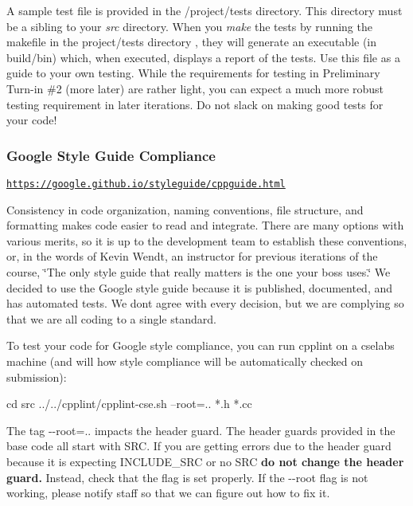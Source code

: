 A sample test file is provided in the /project/tests directory. This directory must be a sibling to your {\itshape src} directory. When you {\itshape make} the tests by running the makefile in the {\ttfamily project/tests} directory , they will generate an executable (in build/bin) which, when executed, displays a report of the tests. Use this file as a guide to your own testing. While the requirements for testing in Preliminary Turn-\/in \#2 (more later) are rather light, you can expect a much more robust testing requirement in later iterations. Do not slack on making good tests for your code!

\subsubsection*{Google Style Guide Compliance}

\href{https://google.github.io/styleguide/cppguide.html}{\tt https\+://google.\+github.\+io/styleguide/cppguide.\+html}

Consistency in code organization, naming conventions, file structure, and formatting makes code easier to read and integrate. There are many options with various merits, so it is up to the development team to establish these conventions, or, in the words of Kevin Wendt, an instructor for previous iterations of the course, \char`\"{}\+The only style guide that really matters is the one your boss uses.\char`\"{} We decided to use the Google style guide because it is published, documented, and has automated tests. We don\textquotesingle{}t agree with every decision, but we are complying so that we are all coding to a single standard.

To test your code for Google style compliance, you can run cpplint on a cselabs machine (and will how style compliance will be automatically checked on submission)\+:


\begin{DoxyCode}
cd src
../../cpplint/cpplint-cse.sh --root=.. *.h *.cc
\end{DoxyCode}


The tag {\ttfamily -\/-\/root=..} impacts the header guard. The header guards provided in the base code all start with {\ttfamily S\+RC}. If you are getting errors due to the header guard because it is expecting {\ttfamily I\+N\+C\+L\+U\+D\+E\+\_\+\+S\+RC} or no {\ttfamily S\+RC} {\bfseries do not change the header guard.} Instead, check that the flag is set properly. If the {\ttfamily -\/-\/root} flag is not working, please notify staff so that we can figure out how to fix it.





